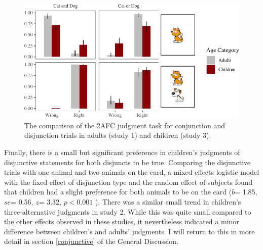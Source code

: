 \documentclass[oneside]{report}
\theoremstyle{definition}
\theoremstyle{definition}
\theoremstyle{definition}
\theoremstyle{remark}
\begin{document}
\begin{figure}[t]

{\centering \includegraphics{figs/BinaryPlotComp-1} 

}

\caption{The comparison of the 2AFC judgment task for conjunction and disjunction trials in adults (study 1) and children (study 3).}\label{fig:BinaryPlotComp}
\end{figure}
Finally, there is a small but significant preference in children's
judgments of disjunctive statements for both disjuncts to be true.
Comparing the disjunctive trials with one animal and two animals on the
card, a mixed-effects logistic model with the fixed effect of
disjunction type and the random effect of subjects found that children
had a slight preference for both animals to be on the card (\(b\)= 1.85,
\(se\)= 0.56, \(z\)= 3.32, \(p < 0.001\) ). There was a similar small
trend in children's three-alternative judgments in study 2. While this
was quite small compared to the other effects observed in these studies,
it nevertheless indicated a minor difference between children's and
adults' judgments. I will return to this in more detail in section
\ref{conjunctive} of the General Discussion.
\end{document}
